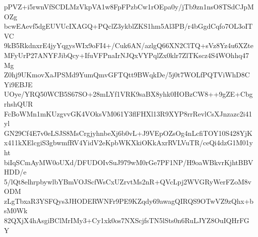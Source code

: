 pPVZ+i5rwnVfSCDLMzVkpVA1w8FpFPzbCw1rOEpa0y/jTb9zn1nsO8TSdCJpMOZg
bcwEAevf5dgEUVUcIXAGQ+PQclZ3ykblZKS1hm5Al3PB/r4bGgdCqfo7OL3oITVC
9kB5RkdnxrE4jyYqgysWIx9oFI4+/Cuk6AN/azlgQ66XN2ClTQ+sVz8Yz4u6XZte
MFyUrP27ANYFJibQcy+IfuVFPnaIrNJQxVYPqlZx0klr7ZlTKscz4S4WOhhq47Mg
Z0hj9UKmovXaJPSMd9YumQmvGFTQtt9BWqkDe/5j0t7WOLfPQTViWhD8CYi9EBJE
UOye/YRQ50WCB5S67SO+28mLYf1VRK9saBX8yhk0HOBzCW8++9gZE+CbgrhshQUR
FcBoWMn1mKUzgvvGK4VOksVM061Y3flFHXl13R9XYP8rrRevlCsXJnzazc2i41yl
GN29Cf4E7v0eLSJS8MsCrgjyhnbeXj6b0vL+J9VEpOZsOg4nLcfiTOY10S428YjK
x411kXElcgiS3gbwmfRV4YidV2eKpbWKXkiOKkAxrRVLVuTR/ceQi4dzG1M01yht
biIqSCmAyMW0oUXd/DFUDOIvSuJ979wM0rGe7PF1NP/H9oaWBkvrKjhtBBVHDD/e
5/lQt8elhrpbywlbYBmVOJScfWsCxUZrvtMs2nR+QVcLpj2WVGRyWerFZoM8vODM
zLgTbxaR3YSFQys3JHODERWNFr9PE9KZqdy69awagQIRQS9OTwVZ9zQhx+bsM0Wk
82QXjX4hAsgiBClMrIMy3+Cy1xk0os7NXScjfsTN5lSts0n6RuLJYZ8OuIQHrFGY

